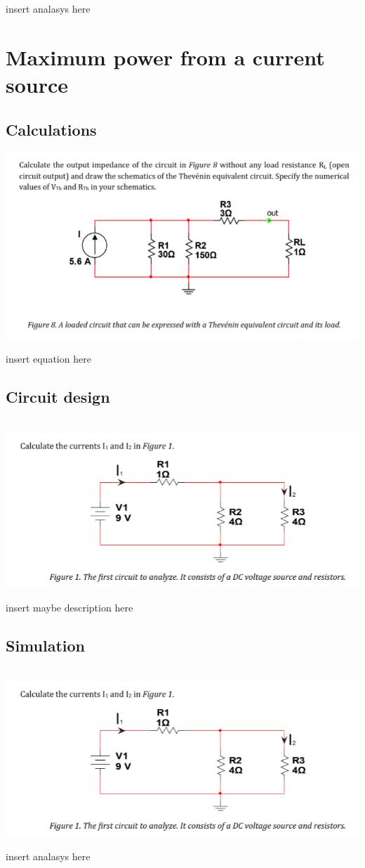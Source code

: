 \documentclass[11pt]{article}
\begin{document}
insert analasys here


\section{\bf{Maximum power from a current source}}

\subsection[25pt]{\bf{Calculations}}

\includegraphics[width=\linewidth]{6.1 calculations.png}


\noindent
insert equation here

\subsection[25pt]{\bf{Circuit design}}

\noindent
\\
\includegraphics[width=\linewidth]{1.1 calculation.png}

insert maybe description here

\subsection[25pt]{\bf{Simulation}}

\noindent
\\
\includegraphics[width=\linewidth]{1.1 calculation.png}

insert analasys here
\end{document}
